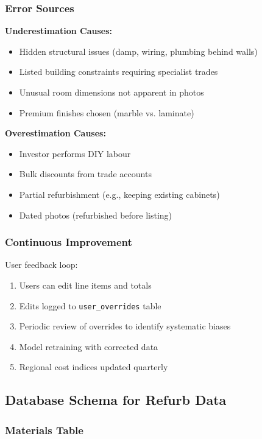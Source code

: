 \documentclass[11pt,a4paper]{article}
\begin{document}
\subsubsection{Error Sources}

\textbf{Underestimation Causes:}
\begin{itemize}
  \item Hidden structural issues (damp, wiring, plumbing behind walls)
  \item Listed building constraints requiring specialist trades
  \item Unusual room dimensions not apparent in photos
  \item Premium finishes chosen (marble vs. laminate)
\end{itemize}

\textbf{Overestimation Causes:}
\begin{itemize}
  \item Investor performs DIY labour
  \item Bulk discounts from trade accounts
  \item Partial refurbishment (e.g., keeping existing cabinets)
  \item Dated photos (refurbished before listing)
\end{itemize}

\subsubsection{Continuous Improvement}

User feedback loop:
\begin{enumerate}
  \item Users can edit line items and totals
  \item Edits logged to \texttt{user\_overrides} table
  \item Periodic review of overrides to identify systematic biases
  \item Model retraining with corrected data
  \item Regional cost indices updated quarterly
\end{enumerate}

\subsection{Database Schema for Refurb Data}

\subsubsection{Materials Table}
\end{document}
